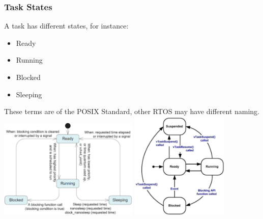 \subsubsection{Task States}
A task has different states, for instance:
\begin{itemize}
    \item Ready
    \item Running
    \item Blocked
    \item Sleeping
\end{itemize}
These terms are of the POSIX Standard, other RTOS may have different naming.\\
\includegraphics[width=0.5\textwidth]{images/RTOS/task_states_posix.png}
\includegraphics[width=0.35\textwidth]{images/RTOS/task_states_freertos.png}

